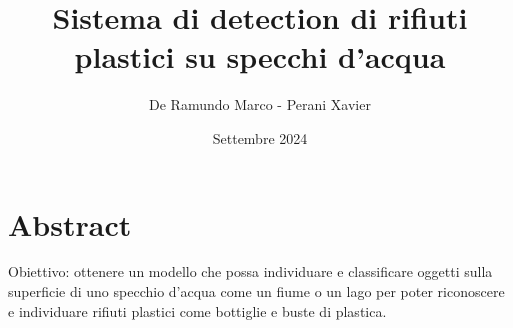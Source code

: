 \documentclass[12pt,a4paper]{article}
\title{Sistema di detection di rifiuti plastici su specchi d'acqua}
\author{De Ramundo Marco - Perani Xavier}
\date{Settembre 2024}
\begin{document}
\maketitle
\section*{Abstract}
Obiettivo: ottenere un modello che possa individuare e classificare oggetti sulla superficie di uno specchio d'acqua come un fiume 
o un lago per poter riconoscere e individuare rifiuti plastici come bottiglie e buste di plastica.












\end{document}
